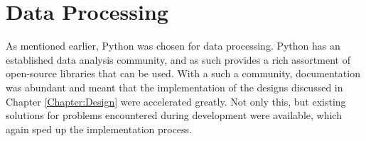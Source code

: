 \section{Data Processing}
As mentioned earlier, Python was chosen for data processing. Python has an established data analysis community, and as such provides a rich assortment of open-source libraries that can be used. With a such a community, documentation was abundant and meant that the implementation of the designs discussed in Chapter \ref{Chapter:Design} were accelerated greatly. Not only this, but existing solutions for problems encountered during development were available, which again sped up the implementation process. 





